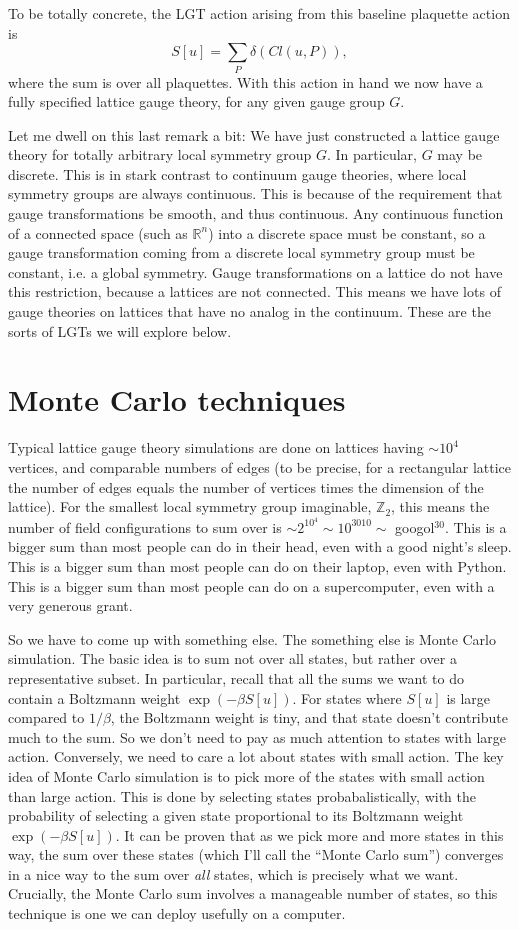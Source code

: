 \documentclass[9pt,twocolumn,twoside]{article}
\begin{document}
To be totally concrete, the LGT action arising from this baseline plaquette action is 
\[S[u] = \sum_P \delta\left(Cl(u,P)\right),\]
where the sum is over all plaquettes.  With this action in hand we now have a fully specified lattice gauge theory, for any given gauge group $G$.  

Let me dwell on this last remark a bit: We have just constructed a lattice gauge theory for totally arbitrary local symmetry group $G$.  In particular, $G$ may be discrete.  This is in stark contrast to continuum gauge theories, where local symmetry groups are always continuous.  This is because of the requirement that gauge transformations be smooth, and thus continuous.  Any continuous function of a connected space (such as $\mathbb{R}^n$) into a discrete space must be constant, so a gauge transformation coming from a discrete local symmetry group must be constant, i.e. a global symmetry.  Gauge transformations on a lattice do not have this restriction, because a lattices are not connected.  This means we have lots of gauge theories on lattices that have no analog in the continuum.  These are the sorts of LGTs we will explore below. 

\section{Monte Carlo techniques}
Typical lattice gauge theory simulations are done on lattices having $\sim 10^4$ vertices, and comparable numbers of edges (to be precise, for a rectangular lattice the number of edges equals the number of vertices times the dimension of the lattice).  For the smallest local symmetry group imaginable, $\mathbb{Z}_2$, this means the number of field configurations to sum over is $\sim 2^{10^4}\sim 10^{3010}\sim$ googol$^{30}$.  This is a bigger sum than most people can do in their head, even with a good night's sleep.  This is a bigger sum than most people can do on their laptop, even with Python.  This is a bigger sum than most people can do on a supercomputer, even with a very generous grant.  

So we have to come up with something else.  The something else is Monte Carlo simulation.  The basic idea is to sum not over all states, but rather over a representative subset.  In particular, recall that all the sums we want to do contain a Boltzmann weight $\exp(-\beta S[u])$.  For states where $S[u]$ is large compared to $1/\beta$, the Boltzmann weight is tiny, and that state doesn't contribute much to the sum.  So we don't need to pay as much attention to states with large action.  Conversely, we need to care a lot about states with small action.  The key idea of Monte Carlo simulation is to pick more of the states with small action than large action.  This is done by selecting states probabalistically, with the probability of selecting a given state proportional to its Boltzmann weight $\exp(-\beta S[u])$.  It can be proven that as we pick more and more states in this way, the sum over these states (which I'll call the ``Monte Carlo sum'') converges in a nice way to the sum over \textit{all} states, which is precisely what we want.  Crucially, the Monte Carlo sum involves a manageable number of states, so this technique is one we can deploy usefully on a computer. 
\end{document}
